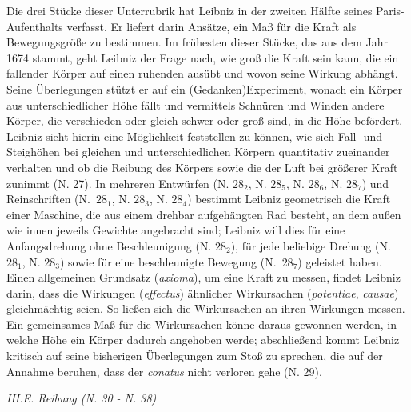 Die drei Stücke dieser Unterrubrik hat Leibniz in der zweiten Hälfte seines Paris-Aufenthalts verfasst. Er liefert darin Ansätze, ein Ma{\ss} für die Kraft als Bewegungsgröße zu bestimmen. Im frühesten dieser Stücke, das aus dem Jahr 1674 stammt, geht Leibniz der Frage nach, wie gro{\ss} die Kraft sein kann, die ein fallender Körper auf einen ruhenden ausübt und wovon seine Wirkung abhängt. Seine Überlegungen stützt er auf ein (Gedanken)Experiment, wonach ein Körper aus unterschiedlicher Höhe fällt und vermittels Schnüren und Winden andere Körper, die verschieden oder gleich schwer oder gro{\ss} sind, in die Höhe befördert. Leibniz sieht hierin eine Möglichkeit feststellen zu können, wie sich Fall- und Steighöhen bei gleichen und unterschiedlichen Körpern quantitativ zueinander verhalten und ob die Reibung des Körpers sowie die der Luft bei grö{\ss}erer Kraft zunimmt (N. 27). In mehreren Entwürfen (N. $28_2$, N. $28_5$, N. $28_6$, N. $28_7$) und Reinschriften (N.~$28_1$, N. $28_3$, N. $28_4$) bestimmt Leibniz geometrisch die Kraft einer Maschine, die aus einem drehbar aufgehängten Rad besteht, an dem au{\ss}en wie innen jeweils Gewichte angebracht sind; Leibniz will dies für eine Anfangsdrehung ohne Beschleunigung (N. $28_2$), für jede beliebige Drehung (N. $28_1$, N. $28_3$) sowie für eine beschleunigte Bewegung (N.~$28_7$) geleistet haben. Einen allgemeinen Grundsatz (\textit{axioma}), um eine Kraft zu messen, findet Leibniz darin, dass die Wirkungen (\textit{effectus}) ähnlicher Wirkursachen (\textit{potentiae}, \textit{causae}) gleichmächtig seien. So lie{\ss}en sich die Wirkursachen an ihren Wirkungen messen. Ein gemeinsames Ma{\ss} für die Wirkursachen könne daraus gewonnen werden, in welche Höhe ein Körper dadurch angehoben werde; abschlie{\ss}end kommt Leibniz kritisch auf seine bisherigen Überlegungen zum Sto{\ss} zu sprechen, die auf der Annahme beruhen, dass der \textit{conatus} nicht verloren gehe (N. 29). \par
\par\vspace{2.0ex}
\noindent
\textit{III.E. Reibung (N. 30 - N. 38)}
\par\noindent
